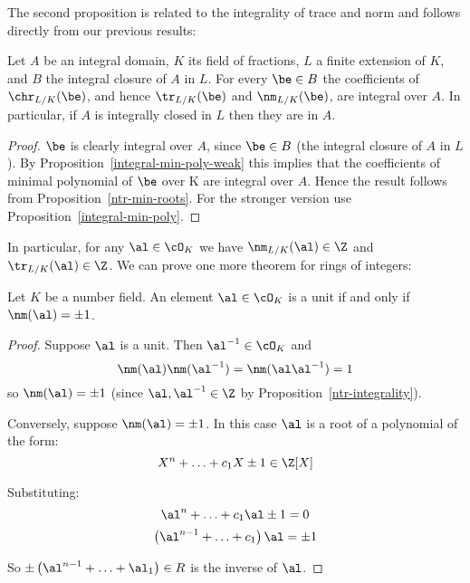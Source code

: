 The second proposition is related to the integrality of trace and norm and follows directly from our previous results:

\begin{pr}[Integrality]
Let $A$ be an integral domain, $K$ its field of fractions, $L$ a finite extension of $K$, and $B$ the integral closure of $A$ in $L$.
For every $\be\in B$ the coefficients of $\chr_{L/K}(\be)$, and hence $\tr_{L/K}(\be)$ and $\nm_{L/K}(\be)$, are integral over $A$. In particular, if $A$ is integrally closed in $L$ then they are in $A$.
\end{pr}
\begin{proof}
$\be$ is clearly integral over $A$, since $\be \in B$ (the integral closure of $A$ in $L$). By Proposition~\ref{integral-min-poly-weak} this implies that the coefficients of minimal polynomial of $\be$ over K are integral over $A$. Hence the result follows from Proposition~\ref{ntr-min-roots}.
For the stronger version use Proposition~\ref{integral-min-poly}.
%
\end{proof}

\noindent In particular, for any $\al \in \cO_K$ we have $\nm_{L/K}(\al) \in \Z$ and $\tr_{L/K}(\al) \in \Z$. We can prove one more theorem for rings of integers:

\begin{pr}
Let $K$ be a number field. 
An element $\al\in \cO_K$ is a unit if and only if $\nm(\al)=\pm 1$.
\end{pr}
\begin{proof}
Suppose $\al$ is a unit. Then $\al^{-1}\in \cO_K$ and
\[
\nm(\al)\nm(\al^{-1})=\nm(\al\al^{-1})%
=1
\]
so $\nm(\al)=\pm1$ (since $\al, \al^{-1} \in \Z$ by Proposition~\ref{ntr-integrality}).

\noindent Conversely, suppose $\nm(\al)=\pm 1$. In this case $\al$ is a root of a polynomial of the form:
\[
X^n + \ldots + c_{1}X \pm 1 \in \Z[X]
\]

\noindent Substituting:
\[
\al^n + \ldots + c_{1}\al \pm 1 = 0
\]
\[
\left(\al^{n-1} + \ldots + c_{1}\right)\al = \pm 1
\]

\noindent So $\pm\left(\al^{n-1} + \ldots + \al_1 \right) \in R$ is the inverse of $\al$.
\end{proof}

